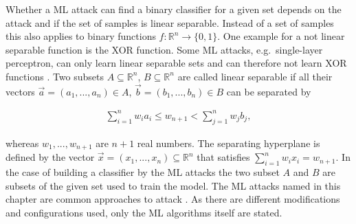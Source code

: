 Whether a \ac{ML} attack can find a binary classifier for a given set depends on the attack and if the set of samples is linear separable. 
Instead of a set of samples this also applies to binary functions $f: \mathbb{R}^n \to \{0,1\}$. %
One example for a not linear separable function is the \ac{XOR} function. %
Some \ac{ML} attacks, e.g.\ single-layer perceptron, can only learn linear separable sets and can therefore not learn \ac{XOR} functions \cite{Minsky1969Perceptrons:Geometry}. %
Two subsets $A \subseteq \mathbb{R}^n$, $B \subseteq \mathbb{R}^n$ are called linear separable if all their vectors $\vec{a} = (a_1, ..., a_n) \in A$, $\vec{b} = (b_1, ..., b_n) \in B$ can be separated by

\begin{align}
\sum_{i=1}^{n} w_i a_i \le w_{n + 1} < \sum_{j=1}^{n} w_j b_j, \label{equ:linearseparable}
\end{align}

whereas $w_1, ..., w_{n + 1}$ are $n + 1$ real numbers.
The separating hyperplane is defined by the vector $\vec{x} = (x_1, ..., x_n) \subseteq \mathbb{R}^n$ that satisfies $\sum_{i = 1}^{n} w_i x_i = w_{n + 1}$.%
In the case of building a classifier by the \ac{ML} attacks the two subset $A$ and $B$ are subsets of the given set used to train the model. %
The \ac{ML} attacks named in this chapter are common approaches to attack \pufs \cite{Ruhrmair2014PUFOverview}.
As there are different modifications and configurations used, only the \ac{ML} algorithms itself are stated.

% 
% 
% 

